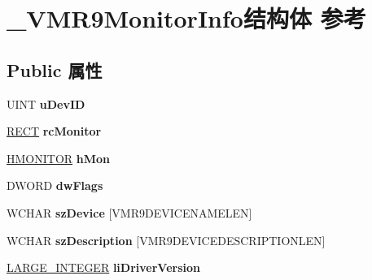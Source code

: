 \hypertarget{struct___v_m_r9_monitor_info}{}\section{\+\_\+\+V\+M\+R9\+Monitor\+Info结构体 参考}
\label{struct___v_m_r9_monitor_info}
\subsection*{Public 属性}
\begin{DoxyCompactItemize}
\item 
\mbox{\label{struct___v_m_r9_monitor_info_a0895251434dbe3b9e42100a83631366a}} 
U\+I\+NT {\bfseries u\+Dev\+ID}
\item 
\mbox{\label{struct___v_m_r9_monitor_info_abb1347e018b7e98f801337b59c44343f}} 
\hyperlink{structtag_r_e_c_t}{R\+E\+CT} {\bfseries rc\+Monitor}
\item 
\mbox{\label{struct___v_m_r9_monitor_info_a6753efd2d66a48bfaa63ead8c69679cd}} 
\hyperlink{interfacevoid}{H\+M\+O\+N\+I\+T\+OR} {\bfseries h\+Mon}
\item 
\mbox{\label{struct___v_m_r9_monitor_info_aa761f6903529a43dd2247df8412c7df6}} 
D\+W\+O\+RD {\bfseries dw\+Flags}
\item 
\mbox{\label{struct___v_m_r9_monitor_info_abe9153c3a2a4d18a5a8e33bfdd0f2dde}} 
W\+C\+H\+AR {\bfseries sz\+Device} \mbox{[}V\+M\+R9\+D\+E\+V\+I\+C\+E\+N\+A\+M\+E\+L\+EN\mbox{]}
\item 
\mbox{\label{struct___v_m_r9_monitor_info_a1b9aade9a42081f3a7e8176104402715}} 
W\+C\+H\+AR {\bfseries sz\+Description} \mbox{[}V\+M\+R9\+D\+E\+V\+I\+C\+E\+D\+E\+S\+C\+R\+I\+P\+T\+I\+O\+N\+L\+EN\mbox{]}
\item 
\mbox{\label{struct___v_m_r9_monitor_info_a055b76848647af89c83d92c23656f1ae}} 
\hyperlink{union___l_a_r_g_e___i_n_t_e_g_e_r}{L\+A\+R\+G\+E\+\_\+\+I\+N\+T\+E\+G\+ER} {\bfseries li\+Driver\+Version}
\item 

\end{DoxyCompactItemize}

